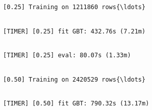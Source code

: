 \documentclass[11pt]{article}
\begin{document}
    \begin{Verbatim}[commandchars=\\\{\}]
[0.25] Training on 1211860 rows{\ldots}
    \end{Verbatim}

    \begin{Verbatim}[commandchars=\\\{\}]

    \end{Verbatim}

    \begin{Verbatim}[commandchars=\\\{\}]
[TIMER] [0.25] fit GBT: 432.76s (7.21m)
    \end{Verbatim}

    \begin{Verbatim}[commandchars=\\\{\}]

    \end{Verbatim}

    \begin{Verbatim}[commandchars=\\\{\}]
[TIMER] [0.25] eval: 80.07s (1.33m)
    \end{Verbatim}

    \begin{Verbatim}[commandchars=\\\{\}]

    \end{Verbatim}

    \begin{Verbatim}[commandchars=\\\{\}]
[0.50] Training on 2420529 rows{\ldots}
    \end{Verbatim}

    \begin{Verbatim}[commandchars=\\\{\}]

    \end{Verbatim}

    \begin{Verbatim}[commandchars=\\\{\}]
[TIMER] [0.50] fit GBT: 790.32s (13.17m)
    \end{Verbatim}

    \begin{Verbatim}[commandchars=\\\{\}]

    \end{Verbatim}
\end{document}
